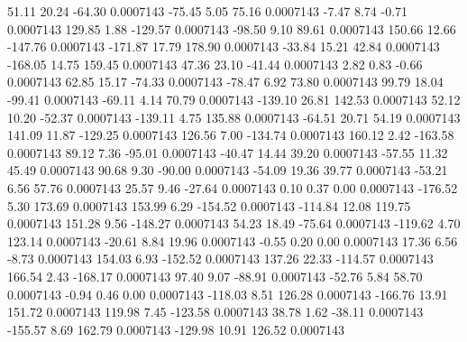        51.11       20.24      -64.30     0.0007143
      -75.45        5.05       75.16     0.0007143
       -7.47        8.74       -0.71     0.0007143
      129.85        1.88     -129.57     0.0007143
      -98.50        9.10       89.61     0.0007143
      150.66       12.66     -147.76     0.0007143
     -171.87       17.79      178.90     0.0007143
      -33.84       15.21       42.84     0.0007143
     -168.05       14.75      159.45     0.0007143
       47.36       23.10      -41.44     0.0007143
        2.82        0.83       -0.66     0.0007143
       62.85       15.17      -74.33     0.0007143
      -78.47        6.92       73.80     0.0007143
       99.79       18.04      -99.41     0.0007143
      -69.11        4.14       70.79     0.0007143
     -139.10       26.81      142.53     0.0007143
       52.12       10.20      -52.37     0.0007143
     -139.11        4.75      135.88     0.0007143
      -64.51       20.71       54.19     0.0007143
      141.09       11.87     -129.25     0.0007143
      126.56        7.00     -134.74     0.0007143
      160.12        2.42     -163.58     0.0007143
       89.12        7.36      -95.01     0.0007143
      -40.47       14.44       39.20     0.0007143
      -57.55       11.32       45.49     0.0007143
       90.68        9.30      -90.00     0.0007143
      -54.09       19.36       39.77     0.0007143
      -53.21        6.56       57.76     0.0007143
       25.57        9.46      -27.64     0.0007143
        0.10        0.37        0.00     0.0007143
     -176.52        5.30      173.69     0.0007143
      153.99        6.29     -154.52     0.0007143
     -114.84       12.08      119.75     0.0007143
      151.28        9.56     -148.27     0.0007143
       54.23       18.49      -75.64     0.0007143
     -119.62        4.70      123.14     0.0007143
      -20.61        8.84       19.96     0.0007143
       -0.55        0.20        0.00     0.0007143
       17.36        6.56       -8.73     0.0007143
      154.03        6.93     -152.52     0.0007143
      137.26       22.33     -114.57     0.0007143
      166.54        2.43     -168.17     0.0007143
       97.40        9.07      -88.91     0.0007143
      -52.76        5.84       58.70     0.0007143
       -0.94        0.46        0.00     0.0007143
     -118.03        8.51      126.28     0.0007143
     -166.76       13.91      151.72     0.0007143
      119.98        7.45     -123.58     0.0007143
       38.78        1.62      -38.11     0.0007143
     -155.57        8.69      162.79     0.0007143
     -129.98       10.91      126.52     0.0007143
